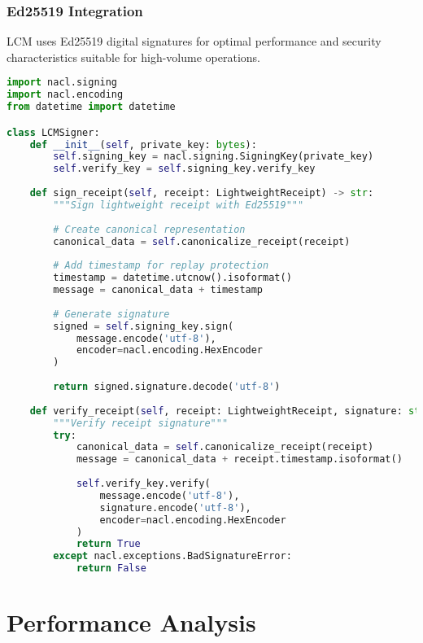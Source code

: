 \documentclass[12pt,a4paper]{article}
\begin{document}
\subsubsection{Ed25519 Integration}

LCM uses Ed25519 digital signatures for optimal performance and security characteristics suitable for high-volume operations.

\begin{lstlisting}[language=Python, caption=Ed25519 Signature Implementation]
import nacl.signing
import nacl.encoding
from datetime import datetime

class LCMSigner:
    def __init__(self, private_key: bytes):
        self.signing_key = nacl.signing.SigningKey(private_key)
        self.verify_key = self.signing_key.verify_key
    
    def sign_receipt(self, receipt: LightweightReceipt) -> str:
        """Sign lightweight receipt with Ed25519"""
        
        # Create canonical representation
        canonical_data = self.canonicalize_receipt(receipt)
        
        # Add timestamp for replay protection
        timestamp = datetime.utcnow().isoformat()
        message = canonical_data + timestamp
        
        # Generate signature
        signed = self.signing_key.sign(
            message.encode('utf-8'),
            encoder=nacl.encoding.HexEncoder
        )
        
        return signed.signature.decode('utf-8')
    
    def verify_receipt(self, receipt: LightweightReceipt, signature: str) -> bool:
        """Verify receipt signature"""
        try:
            canonical_data = self.canonicalize_receipt(receipt)
            message = canonical_data + receipt.timestamp.isoformat()
            
            self.verify_key.verify(
                message.encode('utf-8'),
                signature.encode('utf-8'),
                encoder=nacl.encoding.HexEncoder
            )
            return True
        except nacl.exceptions.BadSignatureError:
            return False
\end{lstlisting}

\section{Performance Analysis}
\end{document}

